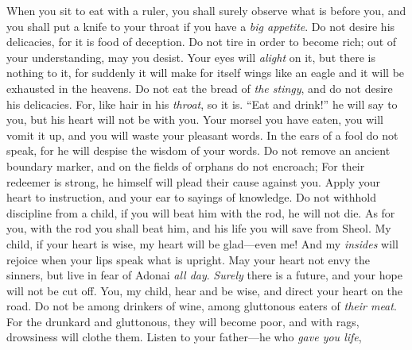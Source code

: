 \begin{biblechapter} %
\verse When you sit to eat with a ruler, 
you shall surely observe what is before you,
\verse and you shall put a knife to your throat 
if you have a \textit{big appetite}.
\verse Do not desire his delicacies, 
for it is food of deception.
\verse Do not tire in order to become rich; 
out of your understanding, may you desist.
\verse Your eyes will \textit{alight} on it, but there is nothing to it, 
for suddenly it will make for itself wings 
like an eagle and it will be exhausted in the heavens.
\verse Do not eat the bread of \textit{the stingy}, 
and do not desire his delicacies.
\verse For, like hair in his \textit{throat}, so it is. 
“Eat and drink!” he will say to you, 
but his heart will not be with you.
\verse Your morsel you have eaten, you will vomit it up, 
and you will waste your pleasant words.
\verse In the ears of a fool do not speak, 
for he will despise the wisdom of your words.
\verse Do not remove an ancient boundary marker, 
and on the fields of orphans do not encroach;
\verse For their redeemer is strong, 
he himself will plead their cause against you.
\verse Apply your heart to instruction, 
and your ear to sayings of knowledge.
\verse Do not withhold discipline from a child, 
if you will beat him with the rod, he will not die.
\verse As for you, with the rod you shall beat him, 
and his life you will save from Sheol.
\verse My child, if your heart is wise, 
my heart will be glad—even me!
\verse And my \textit{insides} will rejoice 
when your lips speak what is upright.
\verse May your heart not envy the sinners, 
but live in fear of Adonai \textit{all day}.
\verse \textit{Surely} there is a future, 
and your hope will not be cut off.
\verse You, my child, hear and be wise, 
and direct your heart on the road.
\verse Do not be among drinkers of wine, 
among gluttonous eaters of \textit{their meat}.
\verse For the drunkard and gluttonous, they will become poor, 
and with rags, drowsiness will clothe them.
\verse Listen to your father—he who \textit{gave you life}, 

\end{biblechapter}
